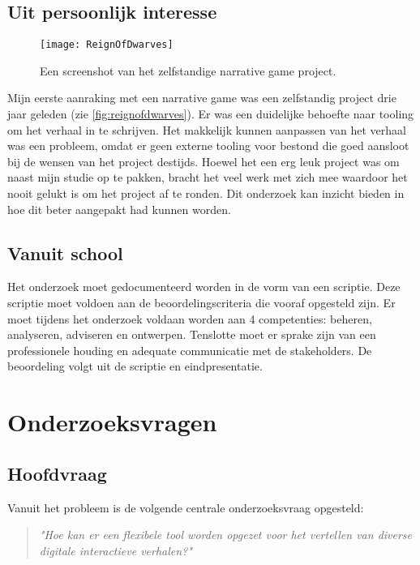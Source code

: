 \subsection{Uit persoonlijk interesse}
\begin{wrapfigure}{r}{0.4\textwidth}
    \texttt{[image: ReignOfDwarves]}
    \caption{Een screenshot van het zelfstandige narrative game project.}
    \label{fig:reignofdwarves}
    \centering
\end{wrapfigure}
Mijn eerste aanraking met een narrative game was een zelfstandig project drie jaar geleden (zie \autoref{fig:reignofdwarves}). Er was een duidelijke behoefte naar tooling om het verhaal in te schrijven. Het makkelijk kunnen aanpassen van het verhaal was een probleem, omdat er geen externe tooling voor bestond die goed aansloot bij de wensen van het project destijds. Hoewel het een erg leuk project was om naast mijn studie op te pakken, bracht het veel werk met zich mee waardoor het nooit gelukt is om het project af te ronden. Dit onderzoek kan inzicht bieden in hoe dit beter aangepakt had kunnen worden.

\subsection{Vanuit school}
Het onderzoek moet gedocumenteerd worden in de vorm van een scriptie. Deze scriptie moet voldoen aan de beoordelingscriteria die vooraf opgesteld zijn. Er moet tijdens het onderzoek voldaan worden aan 4 competenties: beheren, analyseren, adviseren en ontwerpen. Tenslotte moet er sprake zijn van een professionele houding en adequate communicatie met de stakeholders. De beoordeling volgt uit de scriptie en eindpresentatie.


\section{Onderzoeksvragen}
\subsection{Hoofdvraag}
Vanuit het probleem is de volgende centrale onderzoeksvraag opgesteld:
\begin{quote} 
    \centering
    \large
    \textit{
        "Hoe kan er een flexibele tool worden opgezet voor het vertellen van diverse digitale interactieve verhalen?"
    }
\end{quote}

